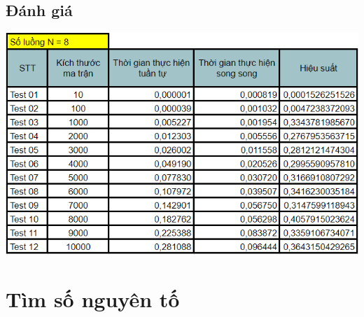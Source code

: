\documentclass[12pt,a4paper]{report}
\begin{document}
\section{Đánh giá}
\begin{center}
	\includegraphics[scale=0.9]{./Photos/MatMul/Benchmark.PNG}
\end{center}

\chapter{Tìm số nguyên tố}
\end{document}
